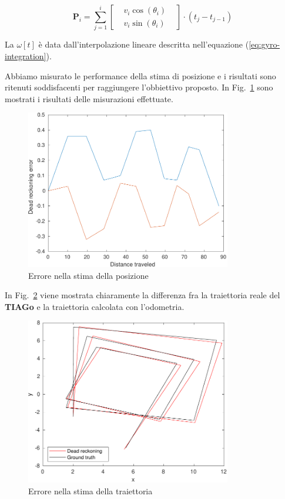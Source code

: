 \documentclass[a4paper]{article}
\begin{document}
	\begin{equation}\label{eq:position-vector-update}
		\textbf{P}_i = \sum_{j = 1}^{i} \begin{bmatrix}
			 & v_i\cos(\theta_i ) & \\
			 & v_i\sin(\theta_i )
		\end{bmatrix}\cdot (t_j-t_{j-1}) 
	\end{equation}

	La $\omega [t]$ è data dall'interpolazione lineare descritta nell'equazione (\ref{eq:gyro-integration}).
	
	Abbiamo misurato le performance della stima di posizione e i risultati sono ritenuti soddisfacenti per raggiungere l'obbiettivo proposto. In Fig.~\ref{fig:dead_reckoning_error} sono mostrati i risultati delle misurazioni effettuate.
	
	\begin{figure}[H]
		\centering
		\includegraphics[width=0.8\textwidth]{./img/dead_reckoning_error.pdf}
		\caption{Errore nella stima della posizione}
		\label{fig:dead_reckoning_error}
	\end{figure}

	In Fig.~\ref{fig:trajectory_error} viene mostrata chiaramente la differenza fra la traiettoria reale del \textbf{TIAGo} e la traiettoria calcolata con l'odometria.
	
	\begin{figure}[H]
		\centering
		\includegraphics[width=0.8\textwidth]{./img/trajectories.pdf}
		\caption{Errore nella stima della traiettoria}
		\label{fig:trajectory_error}
	\end{figure}
	
\end{document}
